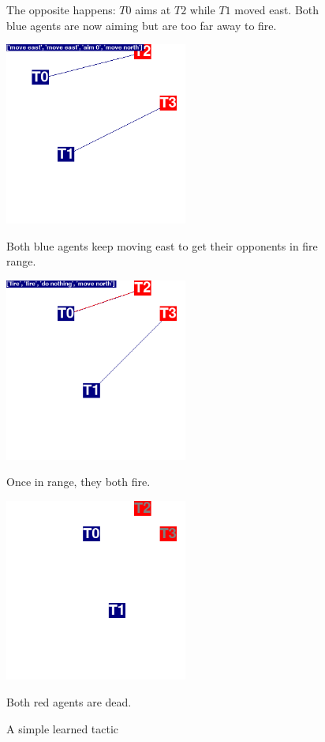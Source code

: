 \begin{figure}[htp]
\begin{minipage}{.45\textwidth}
  \caption*{The opposite happens: $T0$ aims at $T2$ while $T1$ moved east. Both blue agents are now aiming but are too far away to fire.}
\end{minipage}%
\begin{minipage}{.1\textwidth}
\centering
  \caption*{ }
\end{minipage}%
\begin{minipage}{.45\textwidth}
  \centering
  \includegraphics[width=6cm]{images/animation03/screenshot04.png}
    \caption*{Both blue agents keep moving east to get their opponents in fire range.}
\end{minipage}
\begin{minipage}{.5\textwidth}
  \centering
  \includegraphics[width=6cm]{images/animation03/screenshot05.png}
    \caption*{Once in range, they both fire.}
\end{minipage}%
\begin{minipage}{.5\textwidth}
  \centering
  \includegraphics[width=6cm]{images/animation03/screenshot99.png}
  \caption*{Both red agents are dead.}
\end{minipage}
\caption{A simple learned tactic}
\label{fig:simple_tactic01}
\end{figure}

